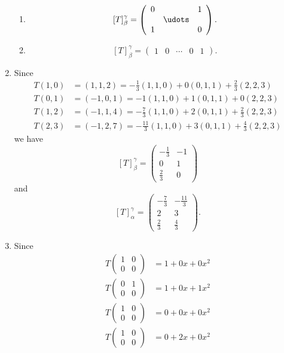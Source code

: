 \begin{enumerate}
\begin{enumerate}
\item \[[T]_{\beta }^{\gamma}=\left(\begin{array}{ccc}0& &1\\ &\udots & \\ 1 & &0 \end{array}\right).\]
\item \[[T]_{\beta }^{\gamma}=\left(\begin{array}{ccccc}1&0& \cdots &0&1 \end{array}\right).\]
\end{enumerate}
\item Since 
\begin{align*}
T(1,0)&=(1,1,2)=-\frac{1}{3}(1,1,0)+0(0,1,1)+\frac{2}{3}(2,2,3)\\
T(0,1)&=(-1,0,1)=-1(1,1,0)+1(0,1,1)+0(2,2,3)\\
T(1,2)&=(-1,1,4)=-\frac{7}{3}(1,1,0)+2(0,1,1)+\frac{2}{3}(2,2,3)\\
T(2,3)&=(-1,2,7)=-\frac{11}{3}(1,1,0)+3(0,1,1)+\frac{4}{3}(2,2,3)
\end{align*}
we have 
\[[T]_{\beta }^{\gamma }=\left(\begin{array}{cc}-\frac{1}{3}&-1\\0&1\\ \frac{2}{3}&0 \end{array}\right)\]
and
\[[T]_{\alpha }^{\gamma }=\left(\begin{array}{cc}-\frac{7}{3}&-\frac{11}{3}\\2&3\\ \frac{2}{3}&\frac{4}{3} \end{array}\right).\]
\item Since
\begin{align*}
T\left(\begin{array}{cc}1&0\\0&0 \end{array}\right) &=1+0x+0x^2\\
T\left(\begin{array}{cc}0&1\\0&0 \end{array}\right) &=1+0x+1x^2\\
T\left(\begin{array}{cc}1&0\\0&0 \end{array}\right) &=0+0x+0x^2\\
T\left(\begin{array}{cc}1&0\\0&0 \end{array}\right) &=0+2x+0x^2

\end{align*}
\end{enumerate}
